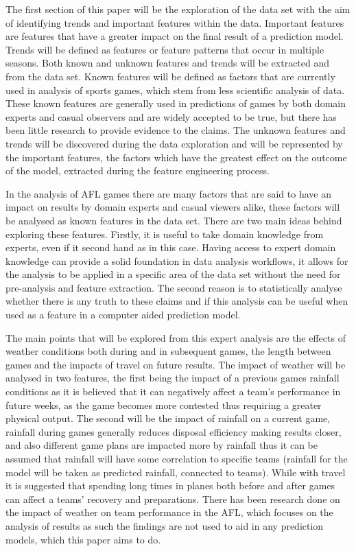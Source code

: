 \documentclass{imc-inf}
\begin{document}
	The first section of this paper will be the exploration of the data set with the aim of identifying trends and important features within the data. Important features are features that have a greater impact on the final result of a prediction model. Trends will be defined as features or feature patterns that occur in multiple seasons. Both known and unknown features and trends will be extracted and from the data set. Known features will be defined as factors that are currently used in analysis of sports games, which stem from less scientific analysis of data. These known features are generally used in predictions of games by both domain experts and casual observers and are widely accepted to be true, but there has been little research to provide evidence to the claims. The unknown features and trends will be discovered during the data exploration and will be represented by the important features, the factors which have the greatest effect on the outcome of the model, extracted during the feature engineering process.\newline
		
	In the analysis of AFL games there are many factors that are said to have an impact on results by domain experts and casual viewers alike, these factors will be analysed as known features in the data set. There are two main ideas behind exploring these features. Firstly, it is useful to take domain knowledge from experts, even if it second hand as in this case. Having access to expert domain knowledge can provide a solid foundation in data analysis workflows, it allows for the analysis to be applied in a specific area of the data set without the need for pre-analysis and feature extraction. The second reason is to statistically analyse whether there is any truth to these claims and if this analysis can be useful when used as a feature in a computer aided prediction model.
	\newline 
	
	The main points that will be explored from this expert analysis are the effects of weather conditions both during and in subsequent games, the length between games and the impacts of travel on future results. The impact of weather will be analysed in two features, the first being the impact of a previous games rainfall conditions as it is believed that it can negatively affect a team’s performance in future weeks, as the game becomes more contested thus requiring a greater physical output. The second will be the impact of rainfall on a current game, rainfall during games generally reduces disposal efficiency making results closer, and also different game plans are impacted more by rainfall thus it can be assumed that rainfall will have some correlation to specific teams (rainfall for the model will be taken as predicted rainfall, connected to teams). While with travel it is suggested that spending long times in planes both before and after games can affect a teams’ recovery and preparations. There has been research done on the impact of weather on team performance in the AFL\cite{website:AFL_Weather}, which focuses on the analysis of results as such the findings are not used to aid in any prediction models, which this paper aims to do.
	\newline
	
\end{document}

